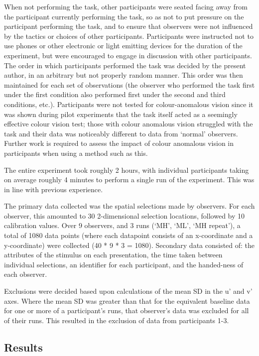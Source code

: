When not performing the task, other participants were seated facing away from the participant currently performing the task, so as not to put pressure on the participant performing the task, and to ensure that observers were not influenced by the tactics or choices of other participants. Participants were instructed not to use phones or other electronic or light emitting devices for the duration of the experiment, but were encouraged to engage in discussion with other participants. The order in which participants performed the task was decided by the present author, in an arbitrary but not properly random manner. This order was then maintained for each set of observations (the observer who performed the task first under the first condition also performed first under the second and third conditions, etc.).
Participants were not tested for colour-anomalous vision since it was shown during pilot experiments that the task itself acted as a seemingly effective colour vision test; those with colour anomalous vision struggled with the task and their data was noticeably different to data from `normal' observers. Further work is required to assess the impact of colour anomalous vision in participants when using a method such as this. 

The entire experiment took roughly 2 hours, with individual participants taking on average roughly 4 minutes to perform a single run of the experiment. This was in line with previous experience.

The primary data collected was the spatial selections made by observers. For each observer, this amounted to 30 2-dimensional selection locations, followed by 10 calibration values. Over 9 observers, and 3 runs (`MH', `ML', `MH repeat'), a total of 1080 data points (where each datapoint consists of an x-coordinate and a y-coordinate) were collected (40 * 9 * 3 = 1080). Secondary data consisted of: the attributes of the stimulus on each presentation, the time taken between individual selections, an identifier for each participant, and the handed-ness of each observer.

Exclusions were decided based upon calculations of the mean SD in the u' and v' axes. Where the mean SD was greater than that for the equivalent baseline data for one or more of a participant's runs, that observer's data was excluded for all of their runs. This resulted in the exclusion of data from participants 1-3.


\subsection{Results}

